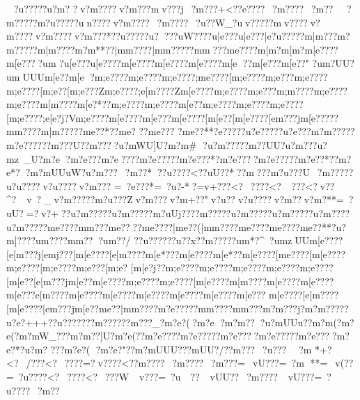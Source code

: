 {{{{{{{{{{{{{{{{{{{{{{{{{{{{{{{{{{{{{{{{{{{{{{{{{{{{{{{{{{{{{{{{{{{{{{{{{{{{{{{{{{{{{{{{{{{{{{{{{{{{{{{{{{{{{{{{{{{{{{{{{{{{{{{{{{{{{{{{{{{{{{{{{{{{{{{{{{{{{{{{{{{{{{{{{{{{{{{{{{{{{{{{{{{{{{{{{{{{{{{{{{{{{{{{{{{{{{{{{{{{{{{{{{{{{{{{{{{{{{{{{{{{{{{{{{{{{{{{{{{{{{{{{{{{{{{{{{{{{{{{{{{{{{{{{{{{{{{{{{{{{{{{{{{{{{{{{{{{{{{{{{{{{{{{{{{{{{{{{{{{{{{{{{{{{{{{{{{{{{{{{{{{{{{{{{{{{{{{{{{{{{{{{{{{{{{{{{{{{{{{{{{{{{{{{{{{{{{{{{{{{{{{{{{{{{{{{{{{{{{{{{{{{{{{{{{{{{~?u?????u?m? 
?v?m????v?m???mv???j~?m???+<??e????~?m????~?m??
~?m?????m?u?????un????v?m????~?m????~?u??W_?uv?????mv????v?m????v?m????v?m???*?}?u???}?}?u???}?uW????u|e??  ?u|e??? |e?u?????m|m???m?m?????m|m????{m?m**??|m{m????|m{m?????m{m???{m{e????{m[m?   {m[m?   {m[e????{m[e????u{m
?u[e???u[e????{m[e????{m[e????{m[e????{m[e
??{m[e ???{m[e??"
?u{m?}UU?u{mUUU{m[e??{m[e
 ?{m;e????{m;e????{m;e????;m{e????[m;e????{m;e???{m;e????{m;e????[m;e??[m;e???Zm;e????;e[m????Zm[e????{m;e????{m;e???{m;m????{m;e????{m;e????{m[m????{m[e?*??{m;e????{m;e????{m[e??{m;e????{m;e????{m;e????[m;e????;e[e?j?V{m;e????{m[e????{m[e???{m[e????[m[e??[m[e????[e{m???j{m[e?????m{m????{m|m?????m{e??*??m{e? ??m{e??? ?m{e??**?}{e?????u?e?????u?e???m?m?????m?e?????}?m???U?}?m????u?mWU]U?m?m#  ?u?m???}?}?m??UU?u?m ???u?mz~_U?m?e   ?m?e  ???m?e????m?e?????m?e???*?m?e????m?e?????m?e??*??m?e*??m?mUUuW?u?m???~?m??*??u????<??uU??*??m???m?u???U~?m?????u?u????v?u????v?m???
=~?e???*=~?u?-* ?=v+???<?~????<?~???<?v??^?~v~?_v?m?????m?u???Zv?m???v?m+??"v?u??v?u????v?m??  v?m?** =~?uU?=?v?+??u?m?????u?m?????m?uUj???}?m?????u?m?????u?m?????u?m????u?m?????m{e??? ?m{m???m{e????m{e????|m{e??(|m{m????{m{e????{m{e????{m{e??**?u?m]????u{m????m{m???u{m??/
??u?????}?u??x?}?m?????u{m*?^~?u{mzUU{m[e????[e[m???j[e{mj???[m[e????[e[m????{m[e*???{m[e????{m[e *??{m[e????[m{e????[m[e????{m;e????[m;e????{m;e???[m;e ?  [m[e?j??{m;e????{m;e????{m;e????{m;e????{m;e????[m[e??[e[m???j{m[e??{m[e????{m;e????{m;e????[m[e????{m[m????{m[e????{m[e????{m[e???{e[m????{m[e????{m[e????{m[e????{m[e????{m[e????{m[e???
{m[e????[e[m????[m[e????[e{m???j{m[e??{m{e??|m{m????{m?e?????m{m??? ?m{m???m?m???j?m?m?????u?e?+++?}?u???????m?????}?m???_?m?e?( ?m?e   ?m?m???u?mUUu??m?m(   ?m?e   (?m?mW_???m?m??]U?m?e  (??m?e ????m?e?????m?e????m?e?????m?e????m?e?*  ?u?m?
???m?e?( ?m?e?" ??m?mUUU??}?mUU?/?}?m??? ~?u???~~?m
*+?<?~/???<?~????=?v????<??m????~?m????~?m???=~vU???=~?m
**=~v(??
=~?u????<?~????<?~???W~v ???=~?u~~??~vUU??~?m????~vU???=~?u????~?m??
}}}}}}}}}}}}}}}}}}}}}}}}}}}}}}}}}}}}}}}}}}}}}}}}}}}}}}}}}}}}}}}}}}}}}}}}}}}}}}}}}}}}}}}}}}}}}}}}}}}}}}}}}}}}}}}}}}}}}}}}}}}}}}}}}}}}}}}}}}}}}}}}}}}}}}}}}}}}}}}}}}}}}}}}}}}}}}}}}}}}}}}}}}}}}}}}}}}}}}}}}}}}}}}}}}}}}}}}}}}}}}}}}}}}}}}}}}}}}}}}}}}}}}}}}}}}}}}}}}}}}}}}}}}}}}}}}}}}}}}}}}}}}}}}}}}}}}}}}}}}}}}}}}}}}}}}}}}}}}}}}}}}}}}}}}}}}}}}}}}}}}}}}}}}}}}}}}}}}}}}}}}}}}}}}}}}}}}}}}}}}}}}}}}}}}}}}}}}}}}}}}}}}}}}}}}}}}}}}}}}}}}}}}}}}}}}}}}}}}}}}}}}}}}}}}}}}}}}}}}}}}}}}}}}}}}}}}}}}}}}}}}}}}}}}}}}}}}}}}}}}}}}}}}}}}}}}}}}}}}}}}}}}}}}}}}}}}}}}}}}}}}}}}
